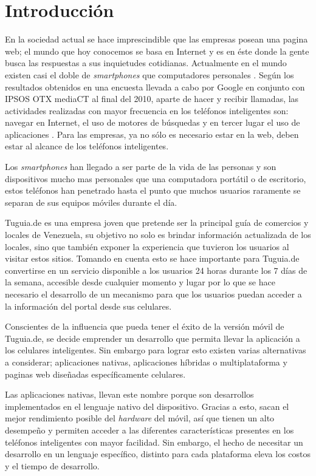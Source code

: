 \chapter{Introducción}


En la sociedad actual se hace imprescindible que las empresas posean una pagina web; el mundo que hoy conocemos se basa en Internet y es en éste donde la gente busca las respuestas a sus inquietudes cotidianas. Actualmente en el mundo existen casi el doble de \textit{smartphones} que computadores personales \cite{DGT}. Según los resultados obtenidos en una encuesta llevada a cabo por Google en conjunto con IPSOS OTX mediaCT al final del 2010, aparte de hacer y recibir llamadas, las actividades realizadas con mayor frecuencia en los teléfonos inteligentes son: navegar en Internet, el uso de motores de búsquedas y en tercer lugar el uso de aplicaciones \cite{TMM}. Para las empresas, ya no sólo es necesario estar en la web, deben estar al alcance de los teléfonos inteligentes.

Los \textit{smartphones} han llegado a ser parte de la vida de las personas y son dispositivos mucho mas personales que una computadora portátil o de escritorio, estos teléfonos han penetrado hasta el punto que muchos usuarios raramente se separan de sus equipos móviles durante el día.

Tuguia.de es una empresa joven que pretende ser la principal guía de comercios y locales de Venezuela, su objetivo no solo es brindar información actualizada de los locales, sino que también exponer la experiencia que tuvieron los usuarios al visitar estos sitios. Tomando en cuenta esto se hace importante para Tuguia.de convertirse en un servicio disponible a los usuarios 24 horas durante los 7 días de la semana, accesible desde cualquier momento y lugar por lo que se hace necesario el desarrollo de un mecanismo para que los usuarios puedan acceder a la información del portal desde sus celulares.

Conscientes de la influencia que pueda tener el éxito de la versión móvil de Tuguia.de, se decide emprender un desarrollo que permita llevar la aplicación a los celulares inteligentes.  Sin embargo para lograr esto existen varias alternativas a considerar; aplicaciones nativas, aplicaciones híbridas o multiplataforma y paginas web diseñadas específicamente celulares.

Las aplicaciones nativas, llevan este nombre porque son desarrollos implementados en el lenguaje nativo del dispositivo. Gracias a esto, sacan el mejor rendimiento posible del \textit{hardware} del móvil, así que tienen un alto desempeño y permiten acceder a las diferentes características presentes en los teléfonos inteligentes con mayor facilidad. Sin embargo, el hecho de necesitar un desarrollo en un lenguaje específico, distinto para cada plataforma eleva los costos y el tiempo de desarrollo. 


